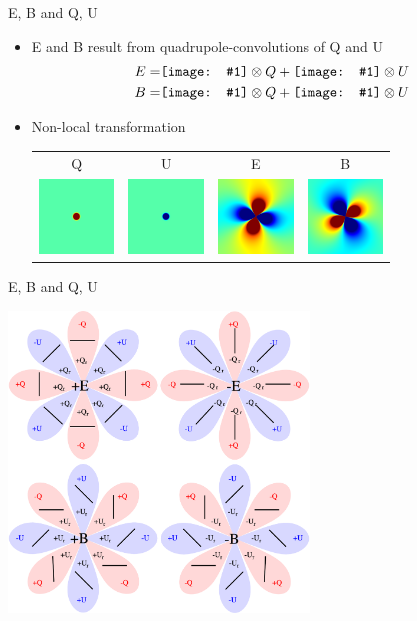 \documentclass{beamer}
\newcommand*{\mimg}[2]{\begingroup
\setbox0=\hbox{\texttt{[image: \#1]}}\parbox{\wd0}{\box0}\endgroup}
\begin{document}
\begin{frame}{E, B and Q, U}
	\begin{itemize}
		\item E and B result from quadrupole-convolutions of Q and U
		\begin{align*}
			E =& \mimg{out_dirty/queb_0.png}{1cm} \otimes Q + \mimg{out_dirty/queb_2.png}{1cm} \otimes U \\
			B =& \mimg{out_dirty/queb_1.png}{1cm} \otimes Q + \mimg{out_dirty/queb_3.png}{1cm} \otimes U
		\end{align*}
	\item Non-local transformation
		\begin{tabular}{cccc}
			Q & U & E & B \\
			\includegraphics[height=2cm]{out_dirty/single_src_tqu_1.png} &
			\includegraphics[height=2cm]{out_dirty/single_src_tqu_2.png} &
			\includegraphics[height=2cm]{out_dirty/single_src_teb_1.png} &
			\includegraphics[height=2cm]{out_dirty/single_src_teb_2.png}
		\end{tabular}
	\end{itemize}
\end{frame}

\begin{frame}{E, B and Q, U}
	\begin{center}
		\includegraphics[height=8cm]{EB_iau.pdf}
	\end{center}
\end{frame}
\end{document}
